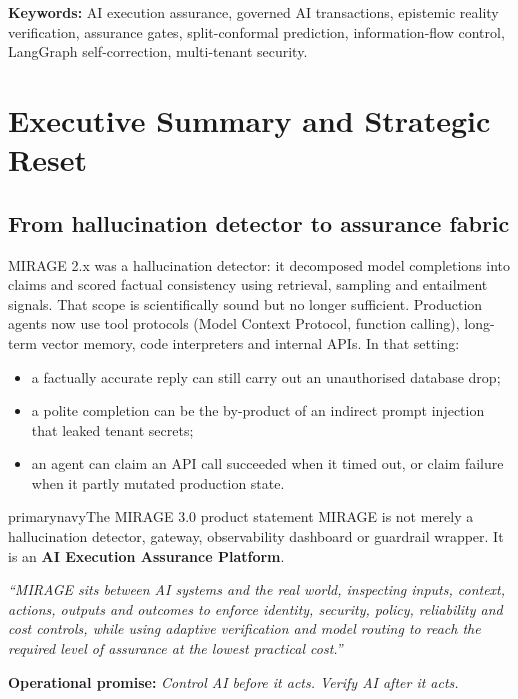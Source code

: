 \documentclass[11pt,a4paper]{article}
\begin{document}
\vfill
{\small\color{darkslate}\textbf{Keywords:} AI execution assurance, governed AI transactions, epistemic reality verification, assurance gates, split-conformal prediction, information-flow control, LangGraph self-correction, multi-tenant security.}

\clearpage
\tableofcontents
\clearpage
\listoffigures
\clearpage
\listoftables
\clearpage
{}

\section{Executive Summary and Strategic Reset}

\subsection{From hallucination detector to assurance fabric}
MIRAGE 2.x was a hallucination detector: it decomposed model completions into claims and scored factual consistency using retrieval, sampling and entailment signals. That scope is scientifically sound but no longer sufficient. Production agents now use tool protocols (Model Context Protocol, function calling), long-term vector memory, code interpreters and internal APIs. In that setting:
\begin{itemize}[leftmargin=*,itemsep=1pt]
  \item a factually accurate reply can still carry out an unauthorised database drop;
  \item a polite completion can be the by-product of an indirect prompt injection that leaked tenant secrets;
  \item an agent can claim an API call succeeded when it timed out, or claim failure when it partly mutated production state.
\end{itemize}

\begin{infobox}{primarynavy}{The MIRAGE 3.0 product statement}
MIRAGE is not merely a hallucination detector, gateway, observability dashboard or guardrail wrapper. It is an \textbf{AI Execution Assurance Platform}.

\medskip
\textit{``MIRAGE sits between AI systems and the real world, inspecting inputs, context, actions, outputs and outcomes to enforce identity, security, policy, reliability and cost controls, while using adaptive verification and model routing to reach the required level of assurance at the lowest practical cost.''}

\medskip
\textbf{Operational promise:} \emph{Control AI before it acts. Verify AI after it acts.}
\end{infobox}
\end{document}
